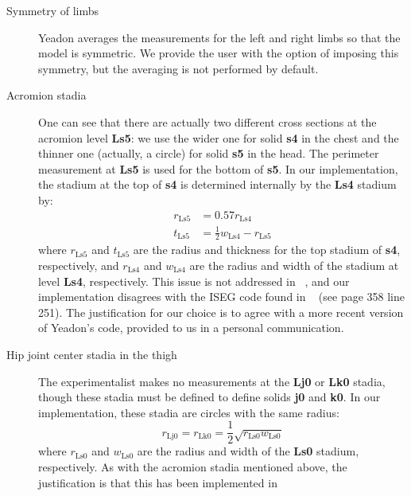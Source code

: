 \documentclass[10pt,a4paper,twocolumn]{article}
\begin{document}
\begin{description}
    \item[Symmetry of limbs] Yeadon averages the measurements for the left and
      right limbs so that the model is symmetric. We provide the user with the
      option of imposing this symmetry, but the averaging is not performed by
      default.
    \item[Acromion stadia] One can see that there are actually two different
      cross sections at the acromion level \textbf{Ls5}: we use the wider one
      for solid \textbf{s4} in the chest and the thinner one (actually, a
      circle) for solid \textbf{s5} in the head. The perimeter measurement at
      \textbf{Ls5} is used for the bottom of \textbf{s5}. In our
      implementation, the stadium at the top of \textbf{s4} is determined
      internally by the \textbf{Ls4} stadium by:
      \begin{align}
          r_{\textrm{Ls5}} &= 0.57 r_{\textrm{Ls4}} \\
          t_{\textrm{Ls5}} &= \frac{1}{2}w_{\textrm{Ls4}} - r_{\textrm{Ls5}}
      \end{align}
      where $r_{\textrm{Ls5}}$ and $t_{\textrm{Ls5}}$ are the radius and
      thickness for the top stadium of \textbf{s4}, respectively, and
      $r_{\textrm{Ls4}}$ and $w_{\textrm{Ls4}}$ are the radius and width of the
      stadium at level \textbf{Ls4}, respectively.  This issue is not addressed
      in ~\cite{Yeadon1990c, Yeadon1990f, Yeadon1990e, Yeadon1990d}, and our
      implementation disagrees with the ISEG code found in ~\cite{Yeadon1984a}
      (see page 358 line 251).  The justification for our choice is to agree
      with a more recent version of Yeadon's code, provided to us in a personal
      communication.
    \item[Hip joint center stadia in the thigh] The experimentalist makes no
      measurements at the \textbf{Lj0} or \textbf{Lk0} stadia, though these
      stadia must be defined to define solids \textbf{j0} and \textbf{k0}. In
      our implementation, these stadia are circles with the same radius:
      \begin{equation}
          r_{\textrm{Lj0}} = r_{\textrm{Lk0}} =
            \frac{1}{2}\sqrt{r_{\textrm{Ls0}} w_{\textrm{Ls0}}}
      \end{equation}
      where $r_{\textrm{Ls0}}$ and $w_{\textrm{Ls0}}$ are the radius and width
      of the \textbf{Ls0} stadium, respectively. As with the acromion stadia
      mentioned above, the justification is that this has been implemented in

\end{description}
\end{document}
